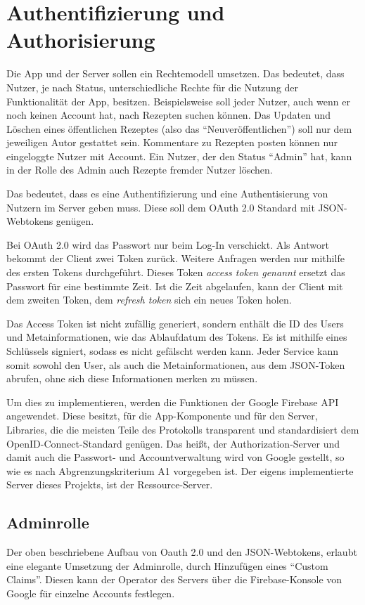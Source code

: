 \section{Authentifizierung und Authorisierung} 
Die App und der Server sollen ein Rechtemodell umsetzen. 
Das bedeutet, dass Nutzer, je nach Status, unterschiedliche Rechte für die Nutzung der Funktionalität der App, besitzen. Beispielsweise soll jeder Nutzer, auch wenn er noch keinen Account hat, nach Rezepten suchen können. Das Updaten und Löschen eines öffentlichen Rezeptes (also das "`Neuveröffentlichen"') soll nur dem jeweiligen Autor gestattet sein. Kommentare zu Rezepten posten können nur eingeloggte Nutzer mit Account.
Ein Nutzer, der den Status "`Admin"' hat, kann in der Rolle des Admin auch Rezepte fremder Nutzer löschen. 

Das bedeutet, dass es eine Authentifizierung und eine Authentisierung von Nutzern im Server geben muss. Diese soll dem OAuth 2.0 Standard mit JSON-Webtokens genügen.

Bei OAuth 2.0 wird das Passwort nur beim Log-In verschickt. Als Antwort bekommt der Client zwei Token zurück.
Weitere Anfragen werden nur mithilfe des ersten Tokens durchgeführt. 
Dieses Token {\em access token genannt} ersetzt das Passwort für eine bestimmte Zeit. 
Ist die Zeit abgelaufen, kann der Client mit dem zweiten Token, dem {\em refresh token} sich ein neues Token holen. 

Das Access Token ist nicht zufällig generiert, sondern enthält die ID des Users und Metainformationen, wie das Ablaufdatum des Tokens. Es ist mithilfe eines Schlüssels signiert, sodass es nicht gefälscht werden kann. 
Jeder Service kann somit sowohl den User, als auch die Metainformationen, aus dem JSON-Token abrufen, ohne sich diese Informationen merken zu müssen.

Um dies zu implementieren, werden die Funktionen der Google Firebase API angewendet. 
Diese besitzt, für die App-Komponente und für den Server, Libraries, die die meisten Teile des Protokolls transparent und standardisiert dem OpenID-Connect-Standard genügen. 
Das heißt, der Authorization-Server und damit auch die Passwort- und Accountverwaltung wird von Google gestellt, so wie es nach Abgrenzungskriterium A1 vorgegeben ist. 
Der eigens implementierte Server dieses Projekts, ist der Ressource-Server. 

\subsection{Adminrolle} 
Der oben beschriebene Aufbau von Oauth 2.0 und den JSON-Webtokens, erlaubt eine elegante Umsetzung der Adminrolle, durch Hinzufügen eines "`Custom Claims"'. Diesen kann der Operator des Servers über die Firebase-Konsole von Google für einzelne Accounts festlegen.

